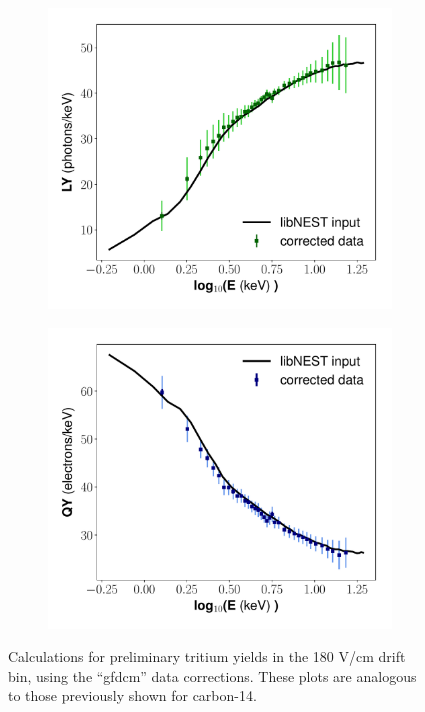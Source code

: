 \begin{figure}[h!]
\begin{subfigure}{0.45\textwidth}
  \caption{}
\end{subfigure}
\begin{subfigure}{0.45\textwidth}
  \centering
  \includegraphics[width=\textwidth]{Figures/yields_corrections/H3_LY_final_gfdcm_180Vcm_prelim.pdf}
  \caption{}
\end{subfigure}%
\begin{subfigure}{0.45\textwidth}
  \centering
  \includegraphics[width=\textwidth]{Figures/yields_corrections/H3_QY_final_gfdcm_180Vcm_prelim.pdf}
  \caption{}
\end{subfigure}
\caption{Calculations for preliminary tritium yields in the 180 V/cm drift bin, using the ``gfdcm'' data corrections. These plots are analogous to those previously shown for carbon-14.}
\label{fig:h3_180}
\end{figure}

